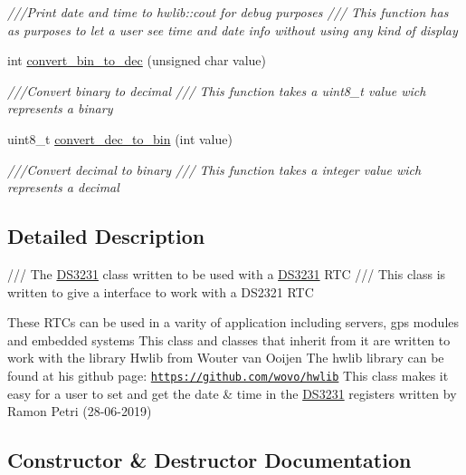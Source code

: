 \begin{DoxyCompactItemize}
\begin{DoxyCompactList}\small\item\em ///\+Print date and time to hwlib\+::cout for debug purposes  /// This function has as purposes to let a user see time and date info without using any kind of display \end{DoxyCompactList}\item 
int \hyperlink{classDS3231_a505df2184898f9773d41ae8fde8e647a}{convert\+\_\+bin\+\_\+to\+\_\+dec} (unsigned char value)
\begin{DoxyCompactList}\small\item\em ///\+Convert binary to decimal  /// This function takes a uint8\+\_\+t value wich represents a binary \end{DoxyCompactList}\item 
uint8\+\_\+t \hyperlink{classDS3231_adbe3aa8366cf09b1ec1f7d0e4aa826db}{convert\+\_\+dec\+\_\+to\+\_\+bin} (int value)
\begin{DoxyCompactList}\small\item\em ///\+Convert decimal to binary  /// This function takes a integer value wich represents a decimal \end{DoxyCompactList}\end{DoxyCompactItemize}


\subsection{Detailed Description}
/// The \hyperlink{classDS3231}{D\+S3231} class written to be used with a \hyperlink{classDS3231}{D\+S3231} R\+TC  /// This class is written to give a interface to work with a D\+S2321 R\+TC 

These R\+TC\textquotesingle{}s can be used in a varity of application including servers, gps modules and embedded systems This class and classes that inherit from it are written to work with the library Hwlib from Wouter van Ooijen The hwlib library can be found at his github page\+: \href{https://github.com/wovo/hwlib}{\tt https\+://github.\+com/wovo/hwlib} This class makes it easy for a user to set and get the date \& time in the \hyperlink{classDS3231}{D\+S3231} registers written by Ramon Petri (28-\/06-\/2019) 

\subsection{Constructor \& Destructor Documentation}
\mbox{\label{classDS3231_ae604eb753bffe5a7752c0c6131c199c0}} 
